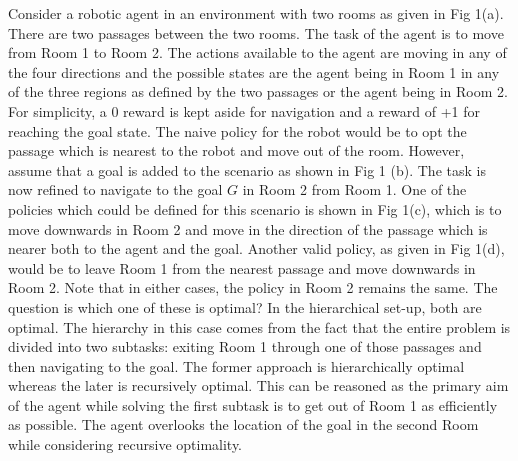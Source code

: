 Consider a robotic agent in an environment with two rooms as given in Fig 1(a).
There are two passages between the two rooms. The task of the agent is to move from Room 1 to Room 2.
The actions available to the agent are moving in any of the four directions and the possible states
are the agent being in Room 1 in any of the three regions as defined by the two passages or the agent being in Room
2.  For simplicity, a 0 reward is kept aside for navigation and a reward of +1 for reaching the goal state.
The naive policy for the robot would be to opt the passage which is nearest to the robot and move out of the room.
However, assume that a goal is added to the scenario as shown in Fig 1 (b).
The task is now refined to navigate to the goal \(G\) in Room 2 from Room 1.
One of the policies which could be defined for this scenario is shown in Fig 1(c),
which is to move downwards in Room 2 and move in the direction of the passage which is nearer
both to the agent and the goal. Another valid policy, as given in Fig 1(d), would be to leave
Room 1 from the nearest passage and move downwards in Room 2. Note that in either cases,
the policy in Room 2 remains the same. The question is which one of these is optimal?
In the hierarchical set-up, both are optimal. The hierarchy in this case comes from the fact that
the entire problem is divided into two subtasks: exiting Room 1 through one of those passages and then
navigating to the goal. The former approach is hierarchically optimal whereas the later is recursively optimal.
This can be reasoned as the primary aim of the agent while solving the first subtask is to get out of Room 1
as efficiently as possible.
The agent overlooks the location of the goal in the second Room while considering recursive optimality.

